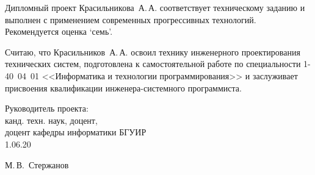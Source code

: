 \begin{singlespace}
{Дипломный проект Красильникова~А.\,А. соответствует техническому заданию и выполнен с применением современных прогрессивных технологий. Рекомендуется оценка ‘семь’.
 
Считаю, что Красильников~А.\,А. освоил технику инженерного проектирования технических систем, подготовлена к самостоятельной работе по специальности 1-40~04~01
<<Информатика и технологии программирования>> и заслуживает присвоения квалификации инженера-системного программиста.
 
 \vfill
 \noindent
 \begin{minipage}{0.54\textwidth}
   \begin{flushleft}
     Руководитель проекта:\\
     канд. техн. наук, доцент,\\
     доцент кафедры информатики БГУИР\\
     1.06.20
   \end{flushleft}
 \end{minipage}
 \begin{minipage}{0.44\textwidth}
   \begin{flushright}
     \underline{\hspace*{3cm}} М.\,В.~Стержанов
   \end{flushright}
 \end{minipage}
}
 
\end{singlespace}
 
\clearpage
 

